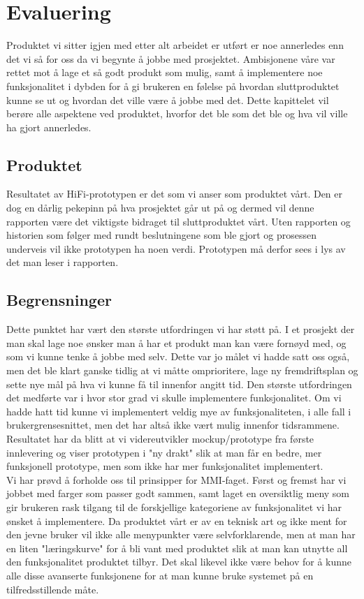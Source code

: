 \chapter{Evaluering}
\lettrine[lines=2]{P}{}roduktet vi sitter igjen med etter alt arbeidet er utført er noe annerledes enn det vi så for oss da vi begynte å jobbe med prosjektet. Ambisjonene våre var rettet mot å lage et så godt produkt som mulig, samt å implementere noe funksjonalitet i dybden for å gi brukeren en følelse på hvordan sluttproduktet kunne se ut og hvordan det ville være å jobbe med det. Dette kapittelet vil berøre alle aspektene ved produktet, hvorfor det ble som det ble og hva vil ville ha gjort annerledes.

\section{Produktet}
Resultatet av HiFi-prototypen er det som vi anser som produktet vårt. Den er dog en dårlig pekepinn på hva prosjektet går ut på og dermed vil denne rapporten være det viktigste bidraget til sluttproduktet vårt. Uten rapporten og historien som følger med rundt beslutningene som ble gjort og prosessen underveis vil ikke prototypen ha noen verdi. Prototypen må derfor sees i lys av det man leser i rapporten.


\section{Begrensninger} \label{sec:begrensninger}
Dette punktet har vært den største utfordringen vi har støtt på. I et prosjekt der man skal lage noe ønsker man å har et produkt man kan være fornøyd med, og som vi kunne tenke å jobbe med selv. Dette var jo målet vi hadde satt oss også, men det ble klart ganske tidlig at vi måtte omprioritere, lage ny fremdriftsplan og sette nye mål på hva vi kunne få til innenfor angitt tid.
Den største utfordringen det medførte var i hvor stor grad vi skulle implementere funksjonalitet. Om vi hadde hatt tid kunne vi implementert veldig mye av funksjonaliteten, i alle fall i brukergrensesnittet, men det har altså ikke vært mulig innenfor tidsrammene.
Resultatet har da blitt at vi videreutvikler mockup/prototype fra første innlevering og viser prototypen i "ny drakt" slik at man får en bedre, mer funksjonell prototype, men som ikke har mer funksjonalitet implementert.\\
Vi har prøvd å forholde oss til prinsipper for MMI-faget. Først og fremst har vi jobbet med farger som passer godt sammen, samt laget en oversiktlig meny som gir brukeren rask tilgang til de forskjellige kategoriene av funksjonalitet vi har ønsket å implementere.
Da produktet vårt er av en teknisk art og ikke ment for den jevne bruker vil ikke alle menypunkter være selvforklarende, men at man har en liten "læringskurve" for å bli vant med produktet slik at man kan utnytte all den funksjonalitet produktet tilbyr.
Det skal likevel ikke være behov for å kunne alle disse avanserte funksjonene for at man kunne bruke systemet på en tilfredsstillende måte.


